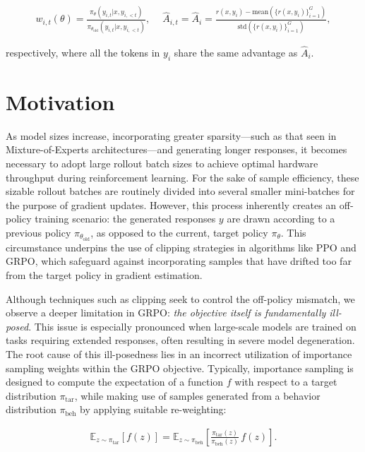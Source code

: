 \begin{align}
    w_{i,t}(\theta)=\frac{ \pi_{\theta} (y_{i,t} | x, y_{i,<t}) }{ \pi_{\theta_\text{old}} (y_{i,t} | x, y_{i,<t})},\quad\ 
    \widehat{A}_{i,t} = \widehat{A}_{i} = \frac{r(x, y_i) - \mathrm{mean} \left( \{ r(x, y_i) \}_{i=1}^G \right) }{ \mathrm{std} \left( \{ r(x, y_i) \}_{i=1}^G \right) },
\end{align}

respectively, where all the tokens in $y_i$ share the same advantage as $\widehat{A}_{i}$.

\section{Motivation}
\label{sec:motivation}

As model sizes increase, incorporating greater sparsity—such as that seen in Mixture-of-Experts architectures—and generating longer responses, it becomes necessary to adopt large rollout batch sizes to achieve optimal hardware throughput during reinforcement learning. For the sake of sample efficiency, these sizable rollout batches are routinely divided into several smaller mini-batches for the purpose of gradient updates. However, this process inherently creates an off-policy training scenario: the generated responses $y$ are drawn according to a previous policy $\pi_{\theta_\text{old}}$, as opposed to the current, target policy $\pi_\theta$. This circumstance underpins the use of clipping strategies in algorithms like PPO and GRPO, which safeguard against incorporating samples that have drifted too far from the target policy in gradient estimation.

Although techniques such as clipping seek to control the off-policy mismatch, we observe a deeper limitation in GRPO: \textit{the objective itself is fundamentally ill-posed}. This issue is especially pronounced when large-scale models are trained on tasks requiring extended responses, often resulting in severe model degeneration. The root cause of this ill-posedness lies in an incorrect utilization of importance sampling weights within the GRPO objective. Typically, importance sampling is designed to compute the expectation of a function $f$ with respect to a target distribution $\pi_\text{tar}$, while making use of samples generated from a behavior distribution $\pi_\text{beh}$ by applying suitable re-weighting:

\begin{align}
\mathbb{E}_{z \sim \pi_\text{tar}} \left[ f(z) \right] = \mathbb{E}_{z \sim \pi_\text{beh}} \left[ \frac{ \pi_\text{tar} (z) }{ \pi_\text{beh} (z)} \, f(z) \right].
\end{align}

